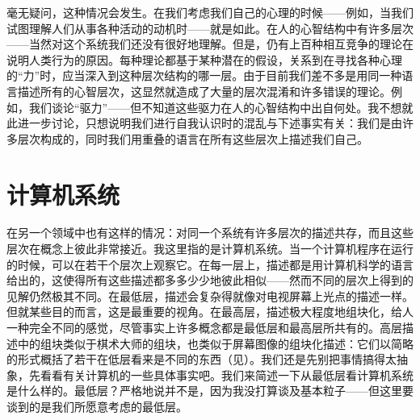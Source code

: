 毫无疑问，这种情况会发生。在我们考虑我们自己的心理的时候——例如，当我们试图理解人们从事各种活动的动机时——就是如此。在人的心智结构中有许多层次——当然对这个系统我们还没有很好地理解。但是，仍有上百种相互竞争的理论在说明人类行为的原因。每种理论都基于某种潜在的假设，关系到在寻找各种心理的“力”时，应当深入到这种层次结构的哪一层。由于目前我们差不多是用同一种语言描述所有的心智层次，这显然就造成了大量的层次混淆和许多错误的理论。例如，我们谈论“驱力”——但不知道这些驱力在人的心智结构中出自何处。我不想就此进一步讨论，只想说明我们进行自我认识时的混乱与下述事实有关：我们是由许多层次构成的，同时我们用重叠的语言在所有这些层次上描述我们自己。

\section{计算机系统}

在另一个领域中也有这样的情况：对同一个系统有许多层次的描述共存，而且这些层次在概念上彼此非常接近。我这里指的是计算机系统。当一个计算机程序在运行的时候，可以在若干个层次上观察它。在每一层上，描述都是用计算机科学的语言给出的，这使得所有这些描述都多多少少地彼此相似——然而不同的层次上得到的见解仍然极其不同。在最低层，描述会复杂得就像对电视屏幕上光点的描述一样。但就某些目的而言，这是最重要的视角。在最高层，描述极大程度地组块化，给人一种完全不同的感觉，尽管事实上许多概念都是最低层和最高层所共有的。高层描述中的组块类似于棋术大师的组块，也类似于屏幕图像的组块化描述：它们以简略的形式概括了若干在低层看来是不同的东西（见）。我们还是先别把事情搞得太抽象，先看看有关计算机的一些具体事实吧。我们来简述一下从最低层看计算机系统是什么样的。最低层？严格地说并不是，因为我没打算谈及基本粒子——但这里要谈到的是我们所愿意考虑的最低层。

